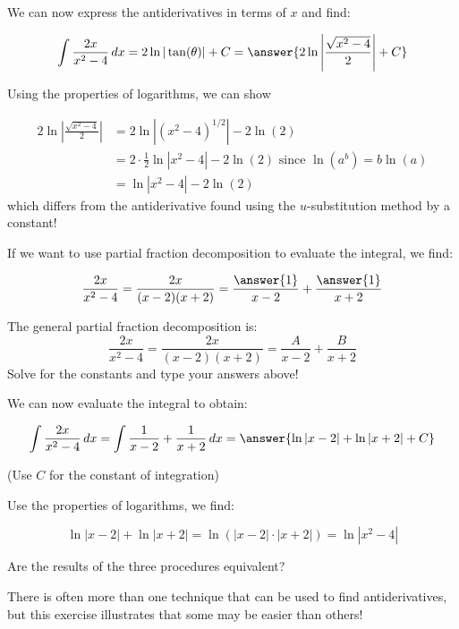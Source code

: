 \documentclass{ximera}
\begin{document}
\begin{exercise}
\begin{exercise}
\begin{exercise}
\begin{exercise}
\begin{exercise}
We can now express the antiderivatives in terms of $x$ and find:

\[
\int \frac{2x}{x^2-4} \d x =  2 \ln|\tan(\theta)|+C = \answer{2 \ln \left| \frac{\sqrt{x^2-4}}{2} \right| +C}
\]

\begin{exercise}
Using the properties of logarithms, we can show

\begin{align*}
2 \ln \left| \frac{ \sqrt{x^2-4} }{2} \right| & = 2 \ln \left|(x^2-4)^{1/2} \right| - 2 \ln(2) \\
& = 2 \cdot \frac{1}{2} \ln \left| x^2-4 \right| - 2 \ln(2) \textrm{ since } \ln\left(a^b\right) = b \ln(a) \\
& =  \ln \left|x^2-4 \right| - 2 \ln(2)
\end{align*}
which differs from the antiderivative found using the $u$-substitution method by a constant!

\end{exercise}
\end{exercise}
\end{exercise}
\end{exercise}
\end{exercise}

\begin{exercise}
If we want to use partial fraction decomposition to evaluate the integral, we find:

\[
\frac{2x}{x^2-4} = \frac{2x}{(x-2)(x+2)} = \frac{\answer{1}}{x-2}+\frac{\answer{1}}{x+2}
\]
\begin{hint}
The general partial fraction decomposition is:
\[
\frac{2x}{x^2-4} = \frac{2x}{(x-2)(x+2)} = \frac{A}{x-2}+\frac{B}{x+2}
\]
Solve for the constants and type your answers above!
\end{hint}

\begin{exercise}
We can now evaluate the integral to obtain:

\[
\int \frac{2x}{x^2-4} \d x = \int \frac{1}{x-2}+\frac{1}{x+2} \d x = \answer{\ln|x-2| + \ln|x+2|+C}
\]
 
(Use $C$ for the constant of integration)

\begin{exercise}
Use the properties of logarithms, we find:

\[ \ln|x-2| + \ln|x+2| = \ln \left( |x-2| \cdot |x+2|  \right) = \ln \left| x^2-4  \right| \]
\end{exercise}
\end{exercise}

\begin{exercise}
Are the results of the three procedures equivalent?
\begin{multipleChoice}
\end{multipleChoice}
There is often more than one technique that can be used to find antiderivatives, but this exercise illustrates that some may be easier than others!
\end{exercise}
\end{exercise}
\end{exercise}
\end{document}
